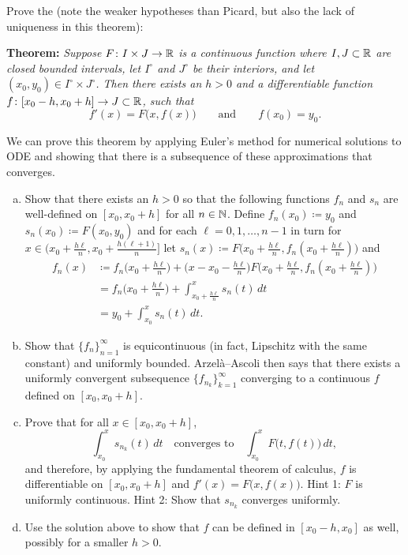 \begin{exercise} \label{exercise:peanoexistence}
Prove the \emph{} (note the weaker
hypotheses than Picard, but also the lack of
uniqueness in this theorem):

\textbf{Theorem:} \emph{Suppose $F \colon I \times J \to {\mathbb{R}}$ is 
a continuous function where
$I, J \subset {\mathbb{R}}$ are closed bounded intervals, 
let $I^\circ$ and $J^\circ$ be their interiors,
and
let $(x_0,y_0) \in I^\circ \times J^\circ$.
Then there exists an $h > 0$ and a differentiable
function $f \colon [x_0 - h, x_0 + h] \to J \subset {\mathbb{R}}$, such that}
\begin{equation*}
f'(x) = F\bigl(x,f(x)\bigr) \qquad \text{and} \qquad f(x_0) = y_0.
\end{equation*}

We can prove this theorem by applying Euler's method
for numerical solutions to ODE and showing that there is
a subsequence of these approximations that converges.
\begin{enumerate}[a)]
\item
Show
that there exists an $h > 0$ so that the following
functions $f_n$ and $s_n$ are well-defined on $[x_0,x_0+h]$
for all $n \in {\mathbb{N}}$.
Define $f_n(x_0) \coloneqq y_0$ and $s_n(x_0) \coloneqq F(x_0,y_0)$
and for each $\ell=0,1,\ldots,n-1$ in turn
for $x \in \bigl(x_0+\frac{h\ell}{n},x_0+\frac{h(\ell+1)}{n}\bigr]$
let $s_n(x) \coloneqq F\bigl(x_0+\tfrac{h\ell}{n},
f_n(x_0+\tfrac{h\ell}{n})\bigr)$ and 
\begin{equation*}
\begin{split}
f_n(x) & \coloneqq f_n\bigl(x_0+\tfrac{h\ell}{n}\bigr)
+ \bigl(x-x_0-\tfrac{h\ell}{n}\bigr) F\bigl(x_0+\tfrac{h\ell}{n},
f_n(x_0+\tfrac{h\ell}{n}) \bigr) \\
& = f_n\bigl(x_0+\tfrac{h\ell}{n}\bigr)
+ \int_{x_0+\tfrac{h\ell}{n}}^x s_n(t) \, dt \\
& = y_0
+ \int_{x_0}^x s_n(t) \, dt .
\end{split}
\end{equation*}
\item
Show that $\{ f_n \}_{n=1}^\infty$ is equicontinuous
(in fact, Lipschitz with the same constant) and uniformly bounded.
Arzel\`a--Ascoli then says that there exists a
uniformly convergent subsequence $\{ f_{n_k} \}_{k=1}^\infty$
converging to a continuous $f$ defined on $[x_0,x_0+h]$.
\item
Prove that for all $x \in [x_0,x_0+h]$,
\begin{equation*}
\int_{x_0}^x s_{n_k}(t) \, dt
\quad
\text{converges to}
\quad
\int_{x_0}^x F\bigl(t,f(t)\bigr) \, dt ,
\end{equation*}
and therefore, by applying the fundamental theorem of calculus,
$f$ is differentiable on $[x_0,x_0+h]$ and $f'(x) = F\bigl(x,f(x)\bigr)$.
Hint 1: $F$ is uniformly continuous.
Hint 2: Show that $s_{n_k}$ converges uniformly.
\item
Use the solution above to show that $f$ can be defined in $[x_0-h,x_0]$ as
well,
possibly for a smaller $h > 0$.
\end{enumerate}
\end{exercise}

